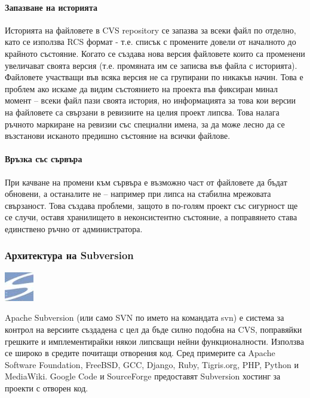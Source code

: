 \documentclass[a4paper]{article}
\begin{document}
      \paragraph{Запазване на историята}

      Историята на файловете в CVS repository се запазва за всеки файл по
      отделно, като се използва RCS формат - т.е. списък с промените довели от
      началното до крайното състояние. Когато се създава нова версия файловете
      които са променени увеличават своята версия (т.е. промяната им се записва
      във файла с историята). Файловете участващи във всяка версия не са
      групирани по никакъв начин. Това е проблем ако искаме да видим
      състоянието на проекта във фиксиран минал момент -- всеки файл пази
      своята история, но информацията за това кои версии на файловете са
      свързани в ревизиите на целия проект липсва. Това налага ръчното
      маркиране на ревизии със специални имена, за да може лесно да се
      възстанови исканото предишно състояние на всички файлове.

      \paragraph{Връзка със сървъра}

      При качване на промени към сървъра е възможно част от файловете да бъдат
      обновени, а останалите не -- например при липса на стабилна мрежовата
      свързаност. Това създава проблеми, защото в по-голям проект със сигурност
      ще се случи, оставя хранилището в неконсистентно състояние, а поправянето
      става единствено ръчно от администратора.

    \subsubsection{Архитектура на Subversion}
    \includegraphics[scale=1.0]{svn_icon}
    
    Apache Subversion (или само SVN по името на командата svn) е система за
    контрол на версиите създадена с цел да бъде силно подобна на CVS,
    поправяйки грешките и имплементирайки някои липсващи нейни функционалности.
    Използва се широко в средите почитащи отворения код. Сред примерите са
    Apache Software Foundation, FreeBSD, GCC, Django, Ruby, Tigris.org, PHP,
    Python и MediaWiki. Google Code и SourceForge предоставят Subversion
    хостинг за проекти с отворен код.
\end{document}
